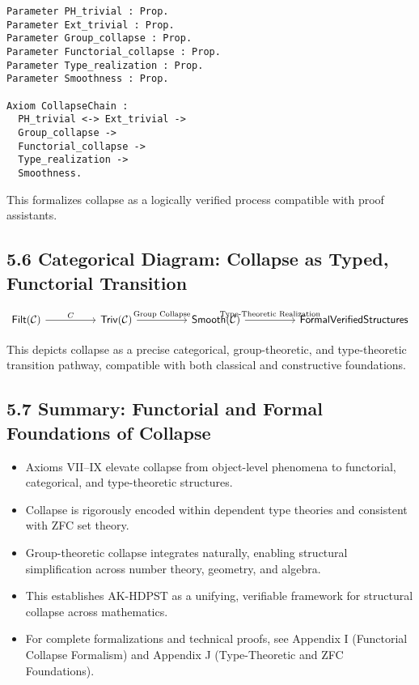 \documentclass[11pt]{article}
\begin{document}
\begin{lstlisting}[language=Coq]
Parameter PH_trivial : Prop.
Parameter Ext_trivial : Prop.
Parameter Group_collapse : Prop.
Parameter Functorial_collapse : Prop.
Parameter Type_realization : Prop.
Parameter Smoothness : Prop.

Axiom CollapseChain :
  PH_trivial <-> Ext_trivial ->
  Group_collapse ->
  Functorial_collapse ->
  Type_realization ->
  Smoothness.
\end{lstlisting}


This formalizes collapse as a logically verified process compatible with proof assistants.

\subsection*{5.6 Categorical Diagram: Collapse as Typed, Functorial Transition}

\[
\begin{tikzcd}[column sep=huge]
\mathsf{Filt}(\mathcal{C}) \arrow[r, "C"]
& \mathsf{Triv}(\mathcal{C}) \arrow[r, "\text{Group Collapse}"]
& \mathsf{Smooth}(\mathcal{C}) \arrow[r, "\text{Type-Theoretic Realization}"]
& \mathsf{Formal Verified Structures}
\end{tikzcd}
\]

This depicts collapse as a precise categorical, group-theoretic, and type-theoretic transition pathway, compatible with both classical and constructive foundations.

\subsection*{5.7 Summary: Functorial and Formal Foundations of Collapse}

\begin{itemize}
    \item Axioms VII–IX elevate collapse from object-level phenomena to functorial, categorical, and type-theoretic structures.
    \item Collapse is rigorously encoded within dependent type theories and consistent with ZFC set theory.
    \item Group-theoretic collapse integrates naturally, enabling structural simplification across number theory, geometry, and algebra.
    \item This establishes AK-HDPST as a unifying, verifiable framework for structural collapse across mathematics.
    \item For complete formalizations and technical proofs, see Appendix I (Functorial Collapse Formalism) and Appendix J (Type-Theoretic and ZFC Foundations).
\end{itemize}
\end{document}

